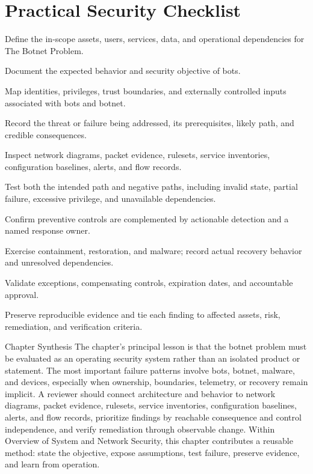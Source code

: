 \documentclass[11pt,letterpaper]{article}
\begin{document}
\section*{Practical Security Checklist}
\begin{CornellChecklist}
\item Define the in-scope assets, users, services, data, and operational dependencies for The Botnet Problem.
\item Document the expected behavior and security objective of bots.
\item Map identities, privileges, trust boundaries, and externally controlled inputs associated with bots and botnet.
\item Record the threat or failure being addressed, its prerequisites, likely path, and credible consequences.
\item Inspect network diagrams, packet evidence, rulesets, service inventories, configuration baselines, alerts, and flow records.
\item Test both the intended path and negative paths, including invalid state, partial failure, excessive privilege, and unavailable dependencies.
\item Confirm preventive controls are complemented by actionable detection and a named response owner.
\item Exercise containment, restoration, and malware; record actual recovery behavior and unresolved dependencies.
\item Validate exceptions, compensating controls, expiration dates, and accountable approval.
\item Preserve reproducible evidence and tie each finding to affected assets, risk, remediation, and verification criteria.
\end{CornellChecklist}
\begin{CornellSummaryBox}{Chapter Synthesis}
The chapter's principal lesson is that the botnet problem must be evaluated as an operating security system rather than an isolated product or statement. The most important failure patterns involve bots, botnet, malware, and devices, especially when ownership, boundaries, telemetry, or recovery remain implicit. A reviewer should connect architecture and behavior to network diagrams, packet evidence, rulesets, service inventories, configuration baselines, alerts, and flow records, prioritize findings by reachable consequence and control independence, and verify remediation through observable change. Within Overview of System and Network Security, this chapter contributes a reusable method: state the objective, expose assumptions, test failure, preserve evidence, and learn from operation.
\end{CornellSummaryBox}
\end{document}

